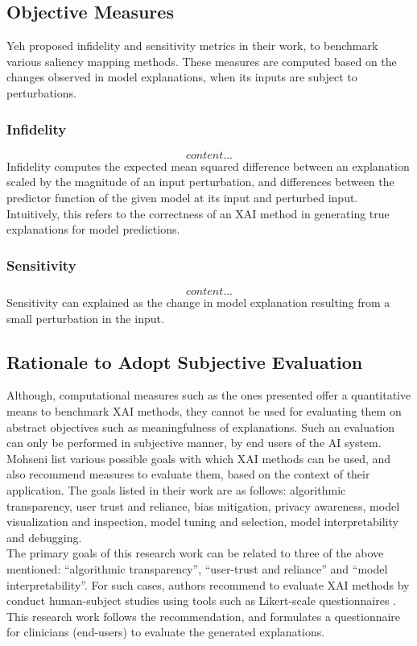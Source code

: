 \documentclass[../report.tex]{subfiles}
\begin{document}
    \subsection{Objective Measures}
    Yeh \etal \cite{yeh2019fidelity} proposed infidelity and sensitivity metrics in their work, to benchmark various saliency mapping methods. These measures are computed based on the changes observed in model explanations, when its inputs are subject to perturbations. 
    \subsubsection{Infidelity}
    \begin{equation}
    	content...
    \end{equation}
    Infidelity computes the expected mean squared difference between an explanation scaled by the magnitude of an input perturbation, and differences between the predictor function of the given model at its input and perturbed input. Intuitively, this refers to the correctness of an XAI method in generating true explanations for model predictions.
    \subsubsection{Sensitivity}
    \begin{equation}
    	content...
    \end{equation}
    Sensitivity can explained as the change in model explanation resulting from a small perturbation in the input.
    
    \subsection{Rationale to Adopt Subjective Evaluation}
    Although, computational measures such as the ones presented offer a quantitative means to benchmark XAI methods, they cannot be used for evaluating them on abstract objectives such as meaningfulness of explanations. Such an evaluation can only be performed in subjective manner, by end users of the AI system.\\
    Mohseni \etal \cite{mohseni2021multidisciplinary} list various possible goals with which XAI methods can be used, and also recommend measures to evaluate them, based on the context of their application. The goals listed in their work are as follows: algorithmic transparency, user trust and reliance, bias mitigation, privacy awareness, model visualization and inspection, model tuning and selection, model interpretability and debugging.\\ 
    The primary goals of this research work can be related to three of the above mentioned: \enquote{algorithmic transparency}, \enquote{user-trust and reliance} and \enquote{model interpretability}. For such cases, authors recommend to evaluate XAI methods by conduct human-subject studies using tools such as Likert-scale questionnaires \cite{likert_scale}. This research work follows the recommendation, and formulates a questionnaire for clinicians (end-users) to evaluate the generated explanations. 
\end{document}
